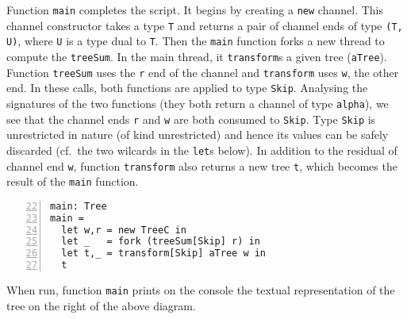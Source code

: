 Function \lstinline|main| completes the script. It begins by creating
a \lstinline|new| channel. This channel constructor takes a type
\lstinline|T| and returns a pair of channel ends of type
\lstinline|(T, U)|, where \lstinline|U| is a type dual to
\lstinline|T|. Then the \lstinline|main| function forks a new thread
to compute the \lstinline|treeSum|. In the main thread, it
\lstinline|transform|s a given tree (\lstinline|aTree|). Function
\lstinline|treeSum| uses the \lstinline|r| end of the channel and
\lstinline|transform| uses \lstinline|w|, the other end. In these
calls, both functions are applied to type \lstinline|Skip|. Analysing
the signatures of the two functions (they both return a channel of
type \lstinline|alpha|), we see that the channel ends \lstinline|r|
and \lstinline|w| are both consumed to \lstinline|Skip|. Type
\lstinline|Skip| is unrestricted in nature (of kind unrestricted) and
hence its values can be safely discarded (cf.\ the two wilcards in
the \lstinline|let|s below). In addition to the residual of channel
end \lstinline|w|, function \lstinline|transform| also returns a new
tree \lstinline|t|, which becomes the result of the \lstinline|main|
function.
%
\begin{lstlisting}[numbers=left,firstnumber=22]
main: Tree
main =
  let w,r = new TreeC in
  let _   = fork (treeSum[Skip] r) in
  let t,_ = transform[Skip] aTree w in
  t
\end{lstlisting}

When run, function \lstinline|main| prints on the console the textual
representation of the tree on the right of the above diagram.

